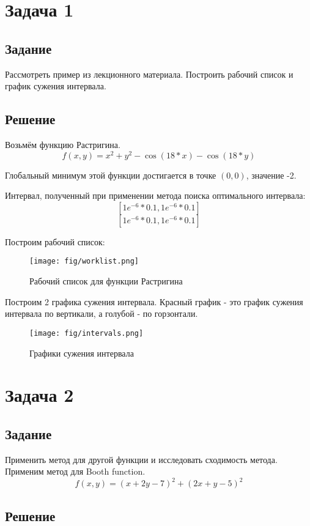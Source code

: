 \section{Задача 1}
\subsection{Задание}

Рассмотреть пример из лекционного материала. Построить рабочий список и график сужения интервала. 

\subsection{Решение}
Возьмём функцию Растригина.
\[f(x, y) = x^2 + y^2 - \cos(18*x) - \cos(18*y)\]

Глобальный минимум этой функции достигается в точке \((0, 0)\), значение -2. 

Интервал, полученный при применении метода поиска оптимального интервала:
\[[1e^{-6} * 0.1, 1e^{-6} * 0.1]\]
\[[1e^{-6} * 0.1, 1e^{-6} * 0.1]\]

Построим рабочий список:
\begin{figure}[h]
\caption{Рабочий список для функции Растригина}
\texttt{[image: fig/worklist.png]}
\centering
\end{figure}

Построим 2 графика сужения интервала. Красный график - это график сужения интервала по вертикали, а голубой - по горзонтали.

\begin{figure}[h]
\caption{Графики сужения интервала}
\texttt{[image: fig/intervals.png]}
\centering
\end{figure}

\section{Задача 2}
\subsection{Задание}
Применить метод для другой функции и исследовать сходимость метода.
Применим метод для Booth function.
\[f(x,y) = \left( x + 2y -7\right)^{2} + \left(2x +y - 5\right)^{2}\]

\subsection{Решение}

